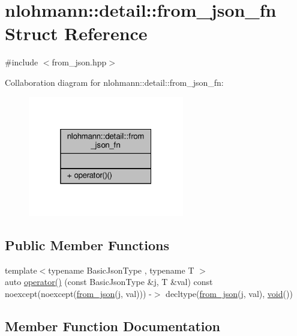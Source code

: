 \hypertarget{structnlohmann_1_1detail_1_1from__json__fn}{}\section{nlohmann\+:\+:detail\+:\+:from\+\_\+json\+\_\+fn Struct Reference}
\label{structnlohmann_1_1detail_1_1from__json__fn}


{\ttfamily \#include $<$from\+\_\+json.\+hpp$>$}



Collaboration diagram for nlohmann\+:\+:detail\+:\+:from\+\_\+json\+\_\+fn\+:\nopagebreak
\begin{figure}[H]
\begin{center}
\leavevmode
\includegraphics[width=193pt]{structnlohmann_1_1detail_1_1from__json__fn__coll__graph}
\end{center}
\end{figure}
\subsection*{Public Member Functions}
\begin{DoxyCompactItemize}
\item 
{\footnotesize template$<$typename Basic\+Json\+Type , typename T $>$ }\\auto \hyperlink{structnlohmann_1_1detail_1_1from__json__fn_a6d14a74e1043072c77892534572d2973}{operator()} (const Basic\+Json\+Type \&j, T \&val) const noexcept(noexcept(\hyperlink{namespacenlohmann_1_1detail_a1f0395aad0fe853a4539288749d3a603}{from\+\_\+json}(j, val))) -\/$>$ decltype(\hyperlink{namespacenlohmann_1_1detail_a1f0395aad0fe853a4539288749d3a603}{from\+\_\+json}(j, val), \hyperlink{namespacenlohmann_1_1detail_a59fca69799f6b9e366710cb9043aa77d}{void}())
\end{DoxyCompactItemize}


\subsection{Member Function Documentation}

